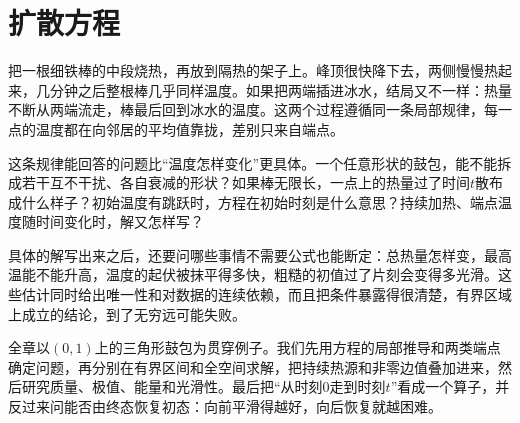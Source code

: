 \chapter{扩散方程}
\label{chap:diffusion-equations}

把一根细铁棒的中段烧热，再放到隔热的架子上。峰顶很快降下去，两侧慢慢热起来，几分钟之后整根棒几乎同样温度。如果把两端插进冰水，结局又不一样：热量不断从两端流走，棒最后回到冰水的温度。这两个过程遵循同一条局部规律，每一点的温度都在向邻居的平均值靠拢，差别只来自端点。

这条规律能回答的问题比“温度怎样变化”更具体。一个任意形状的鼓包，能不能拆成若干互不干扰、各自衰减的形状？如果棒无限长，一点上的热量过了时间$t$散布成什么样子？初始温度有跳跃时，方程在初始时刻是什么意思？持续加热、端点温度随时间变化时，解又怎样写？

具体的解写出来之后，还要问哪些事情不需要公式也能断定：总热量怎样变，最高温能不能升高，温度的起伏被抹平得多快，粗糙的初值过了片刻会变得多光滑。这些估计同时给出唯一性和对数据的连续依赖，而且把条件暴露得很清楚，有界区域上成立的结论，到了无穷远可能失败。

全章以$(0,1)$上的三角形鼓包为贯穿例子。我们先用方程的局部推导和两类端点确定问题，再分别在有界区间和全空间求解，把持续热源和非零边值叠加进来，然后研究质量、极值、能量和光滑性。最后把“从时刻$0$走到时刻$t$”看成一个算子，并反过来问能否由终态恢复初态：向前平滑得越好，向后恢复就越困难。
















